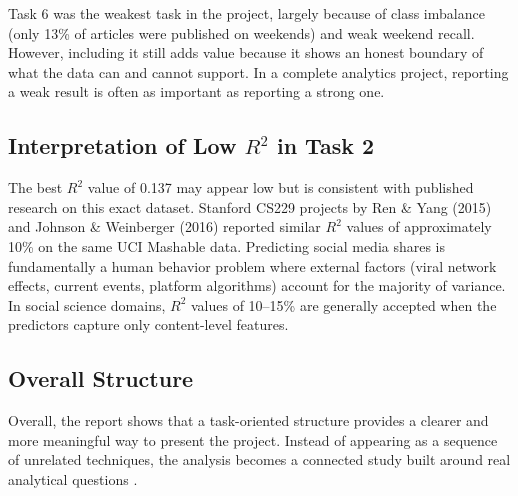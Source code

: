 Task 6 was the weakest task in the project, largely because of class imbalance (only 13\% of articles were published on weekends) and weak weekend recall. However, including it still adds value because it shows an honest boundary of what the data can and cannot support. In a complete analytics project, reporting a weak result is often as important as reporting a strong one.

\subsection{Interpretation of Low $R^2$ in Task 2}

The best $R^2$ value of 0.137 may appear low but is consistent with published research on this exact dataset. Stanford CS229 projects by Ren \& Yang (2015) and Johnson \& Weinberger (2016) reported similar $R^2$ values of approximately 10\% on the same UCI Mashable data. Predicting social media shares is fundamentally a human behavior problem where external factors (viral network effects, current events, platform algorithms) account for the majority of variance. In social science domains, $R^2$ values of 10--15\% are generally accepted when the predictors capture only content-level features.

\subsection{Overall Structure}

Overall, the report shows that a task-oriented structure provides a clearer and more meaningful way to present the project. Instead of appearing as a sequence of unrelated techniques, the analysis becomes a connected study built around real analytical questions \cite{bishop2006prml,han2011datamining}.
